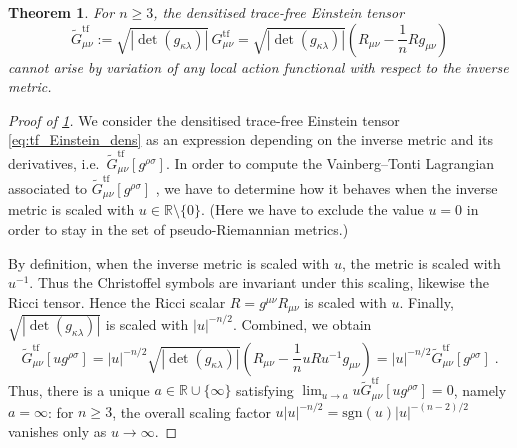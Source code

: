 \documentclass[10pt,a4paper]{amsart}
\newtheorem{theorem}{Theorem}
\newcommand*{\R}{\mathbb R}
\begin{document}
\begin{theorem}
  \label{thm:non-var}
  For $n \ge 3$, the densitised trace-free Einstein tensor
  \begin{equation}
    \label{eq:tf_Einstein_dens}
    \tilde{G}^\mathrm{tf}_{\mu\nu}
    := \sqrt{|\det(g_{\kappa\lambda})|} \, G^\mathrm{tf}_{\mu\nu}
    = \sqrt{|\det(g_{\kappa\lambda})|}
      \left(R_{\mu\nu} - \frac{1}{n} R g_{\mu\nu}\right)
  \end{equation}
  cannot arise by variation of \emph{any} local action functional with
  respect to the inverse metric.
\end{theorem}

\begin{proof}[Proof of \cref{thm:non-var}]
  We consider the densitised trace-free Einstein tensor
  \eqref{eq:tf_Einstein_dens} as an expression depending on the
  inverse metric and its derivatives, i.e.\
  $\tilde{G}^\mathrm{tf}_{\mu\nu}[g^{\rho\sigma}]$.  In order to
  compute the Vainberg--Tonti Lagrangian associated to
  $\tilde{G}^\mathrm{tf}_{\mu\nu}[g^{\rho\sigma}]$ , we have to
  determine how it behaves when the inverse metric is scaled with $u
  \in \R \setminus \{0\}$.  (Here we have to exclude the value $u = 0$
  in order to stay in the set of pseudo-Riemannian metrics.)

  By definition, when the inverse metric is scaled with $u$, the
  metric is scaled with $u^{-1}$.  Thus the Christoffel symbols are
  invariant under this scaling, likewise the Ricci tensor.  Hence the
  Ricci scalar $R = g^{\mu\nu} R_{\mu\nu}$ is scaled with $u$.
  Finally, $\sqrt{|\det(g_{\kappa\lambda})|}$ is scaled with
  $|u|^{-n/2}$.  Combined, we obtain
  \begin{equation}
    \tilde{G}^\mathrm{tf}_{\mu\nu}[u g^{\rho\sigma}]
    = |u|^{-n/2} \sqrt{|\det(g_{\kappa\lambda})|}
      \left(R_{\mu\nu} - \frac{1}{n} u R u^{-1} g_{\mu\nu}\right)
    = |u|^{-n/2} \tilde{G}^\mathrm{tf}_{\mu\nu}[g^{\rho\sigma}] \; .
  \end{equation}
  Thus, there is a unique $a \in \R \cup \{\infty\}$ satisfying
  $\lim_{u \to a} u \tilde{G}^\mathrm{tf}_{\mu\nu}[u g^{\rho\sigma}] =
  0$, namely $a = \infty$: for $n \ge 3$, the overall scaling factor
  $u |u|^{-n/2} = \mathrm{sgn}(u) |u|^{-(n-2)/2}$ vanishes only as $u
  \to \infty$.


\end{proof}
\end{document}

